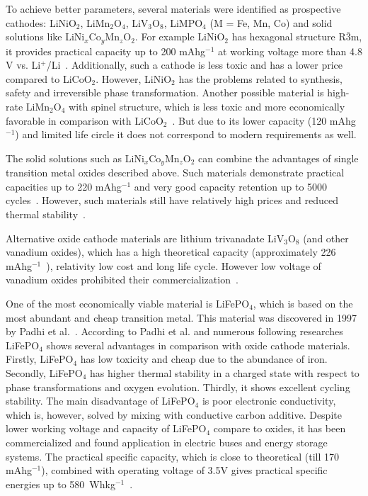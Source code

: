 To achieve better parameters, several materials were identified as prospective cathodes: LiNiO$_2$, LiMn$_2$O$_4$, LiV$_3$O$_8$, LiMPO$_4$ (M = Fe, Mn, Co) and solid solutions like LiNi$_x$Co$_y$Mn$_z$O$_2$. For example LiNiO$_2$ has hexagonal structure R$\bar3$m, it provides practical capacity up to 200 mAhg$^{-1}$ at working voltage more than 4.8 V vs. Li$^+$/Li~\cite{amine2000olivine}. Additionally, such a cathode is less toxic and has a lower price compared to LiCoO$_2$. However, LiNiO$_2$ has the problems related to synthesis, safety and irreversible phase transformation. 
Another possible material is high-rate LiMn$_2$O$_4$ with spinel structure, which is less toxic and more economically favorable in comparison with LiCoO$_2$~\cite{yan1999microwave}. But due to its lower capacity (120 mAhg$^{-1}$) and limited life circle it does not correspond to modern requirements as well. 

The solid solutions  such as LiNi$_x$Co$_y$Mn$_z$O$_2$ can combine the advantages of single transition metal oxides described above. Such materials demonstrate practical capacities up to 220 mAhg$^{-1}$ and very good capacity retention up to 5000 cycles~\cite{salehen2017evaluation}. However, such materials still have relatively high prices and reduced thermal stability~\cite{elong2013solid}. 

Alternative oxide cathode materials are lithium trivanadate LiV$_3$O$_8$ (and other vanadium oxides), which has a high theoretical capacity (approximately 226 mAhg$^{-1}$~\cite{sun2010electrochemical}), relativity low cost and long life cycle. However low voltage of vanadium oxides prohibited their commercialization~\cite{liu2009effects}. 

One of the most economically viable material is LiFePO$_4$, which is based on the most abundant and cheap transition metal. This material was discovered in 1997 by Padhi et al.~\cite{padhi1997effect}. According to Padhi et al. and numerous following researches LiFePO$_4$ shows several advantages in comparison with oxide cathode materials. Firstly, LiFePO$_4$ has low toxicity and cheap due to the abundance of iron. Secondly, LiFePO$_4$ has higher thermal stability in a charged state with respect to phase transformations and oxygen evolution. Thirdly, it shows excellent cycling stability. 
The main disadvantage of LiFePO$_4$ is poor electronic conductivity, which is, however, solved by mixing with conductive carbon additive.
Despite lower working voltage and capacity
of LiFePO$_4$ compare to oxides, it has been commercialized and found application in electric buses and energy storage systems. 
The practical specific capacity, which is close to theoretical (till 170 mAhg$^{-1}$), combined with operating voltage of 3.5V gives practical
specific energies up to 580~Whkg$^{-1}$~\cite{franger2003comparison}. 

